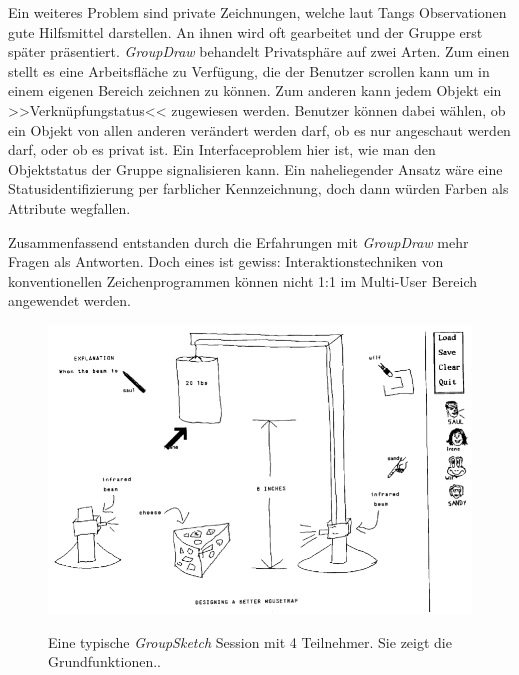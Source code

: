 \medskip Ein weiteres Problem sind private Zeichnungen, welche laut Tangs Observationen gute Hilfsmittel darstellen. An ihnen wird oft gearbeitet und der Gruppe erst später präsentiert. \emph{GroupDraw} behandelt Privatsphäre auf zwei Arten. Zum einen stellt es eine Arbeitsfläche zu Verfügung, die der Benutzer scrollen kann um in einem eigenen Bereich zeichnen zu können. Zum anderen kann jedem Objekt ein >>Verknüpfungstatus<< zugewiesen werden. \cite{Dewan:1991:FUI:108844.108851} Benutzer können dabei wählen, ob ein Objekt von allen anderen verändert werden darf, ob es nur angeschaut werden darf, oder ob es privat ist. Ein Interfaceproblem hier ist, wie man den Objektstatus der Gruppe signalisieren kann. Ein naheliegender Ansatz wäre eine Statusidentifizierung per farblicher Kennzeichnung, doch dann würden Farben als Attribute wegfallen.

\medskip Zusammenfassend entstanden durch die Erfahrungen mit \emph{GroupDraw} mehr Fragen als Antworten. Doch eines ist gewiss: Interaktionstechniken von konventionellen Zeichenprogrammen können nicht 1:1 im Multi-User Bereich angewendet werden.

\begin{figure}
        {\includegraphics[width=1\linewidth]{gfx/greenbergGroupSketch}}
		\caption[GroupSketch]{Eine typische \emph{GroupSketch} Session mit 4 Teilnehmer. Sie zeigt die Grundfunktionen..}\label{fig:greenbergGroupSketch}
\end{figure}

